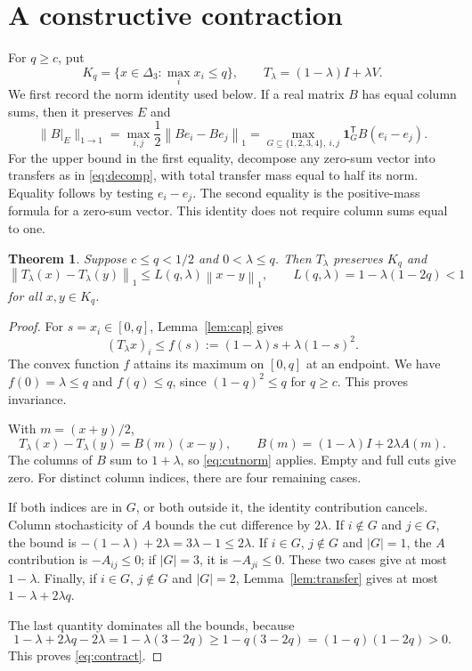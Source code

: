 \documentclass[11pt]{amsart}
\newtheorem{theorem}{Theorem}[section]
\theoremstyle{definition}
\newcommand{\D}{\Delta_3}
\newcommand{\one}{\mathbf 1}
\newcommand{\norm}[1]{\left\lVert#1\right\rVert_1}
\begin{document}
\section{A constructive contraction}\label{sec:average}
For $q\ge c$, put
\[
 K_q=\{x\in\D:\max_i x_i\le q\},
 \qquad T_\lambda=(1-\lambda)I+\lambda V.
\]
We first record the norm identity used below. If a real matrix $B$ has equal column sums, then it preserves $E$ and
\begin{equation}\label{eq:cutnorm}
 \|B|_E\|_{1\to1}
 =\max_{i,j}\frac12\norm{Be_i-Be_j}
 =\max_{G\subseteq\{1,2,3,4\},\ i,j}
       \one_G^{\mathsf T}B(e_i-e_j).
\end{equation}
For the upper bound in the first equality, decompose any zero-sum vector into transfers as in \eqref{eq:decomp}, with total transfer mass equal to half its norm. Equality follows by testing $e_i-e_j$. The second equality is the positive-mass formula for a zero-sum vector. This identity does not require column sums equal to one.

\begin{theorem}\label{thm:contract}
Suppose $c\le q<1/2$ and $0<\lambda\le q$. Then $T_\lambda$ preserves $K_q$ and
\begin{equation}\label{eq:contract}
 \norm{T_\lambda(x)-T_\lambda(y)}
 \le L(q,\lambda)\norm{x-y},\qquad
 L(q,\lambda)=1-\lambda(1-2q)<1
\end{equation}
for all $x,y\in K_q$.
\end{theorem}
\begin{proof}
For $s=x_i\in[0,q]$, Lemma~\ref{lem:cap} gives
\[
 (T_\lambda x)_i\le f(s):=(1-\lambda)s+\lambda(1-s)^2.
\]
The convex function $f$ attains its maximum on $[0,q]$ at an endpoint. We have $f(0)=\lambda\le q$ and $f(q)\le q$, since $(1-q)^2\le q$ for $q\ge c$. This proves invariance.

With $m=(x+y)/2$,
\[
 T_\lambda(x)-T_\lambda(y)=B(m)(x-y),\qquad
 B(m)=(1-\lambda)I+2\lambda A(m).
\]
The columns of $B$ sum to $1+\lambda$, so \eqref{eq:cutnorm} applies. Empty and full cuts give zero. For distinct column indices, there are four remaining cases.

If both indices are in $G$, or both outside it, the identity contribution cancels. Column stochasticity of $A$ bounds the cut difference by $2\lambda$. If $i\notin G$ and $j\in G$, the bound is $-(1-\lambda)+2\lambda=3\lambda-1\le2\lambda$. If $i\in G$, $j\notin G$ and $|G|=1$, the $A$ contribution is $-A_{ij}\le0$; if $|G|=3$, it is $-A_{ji}\le0$. These two cases give at most $1-\lambda$. Finally, if $i\in G$, $j\notin G$ and $|G|=2$, Lemma~\ref{lem:transfer} gives at most $1-\lambda+2\lambda q$.

The last quantity dominates all the bounds, because
\[
 1-\lambda+2\lambda q-2\lambda
 =1-\lambda(3-2q)
 \ge1-q(3-2q)=(1-q)(1-2q)>0.
\]
This proves \eqref{eq:contract}.
\end{proof}
\end{document}
